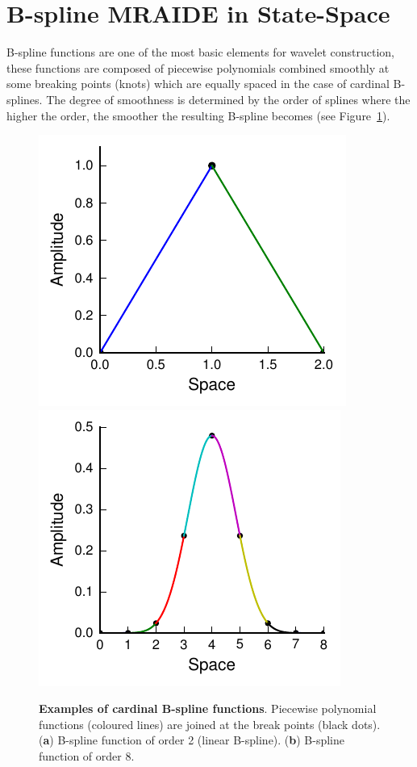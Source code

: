 \documentclass[11pt,draftcls,onecolumn,peerreview]{IEEEtran}
\begin{document}
\section{B-spline MRAIDE in State-Space }
B-spline functions are one of the most basic elements for wavelet construction, these functions are composed of  piecewise polynomials combined smoothly at some breaking points (knots) which are equally spaced in the case of cardinal B-splines. The degree of smoothness is determined by the order of splines \cite{Goswami1999} where the higher the order, the smoother the resulting B-spline becomes (see Figure~\ref{fig:Figure0}).
\begin{figure}[!ht]
\centering
\includegraphics{./Graph/Figure0a.pdf}
\includegraphics{./Graph/Figure0b.pdf}
\caption{{\bf Examples of cardinal B-spline functions}. Piecewise polynomial functions (coloured lines) are joined at the break points (black dots). (\textbf{a}) B-spline function of order 2 (linear B-spline). (\textbf{b}) B-spline function of order 8.}
\label{fig:Figure0}
\end{figure}
 
\end{document}
